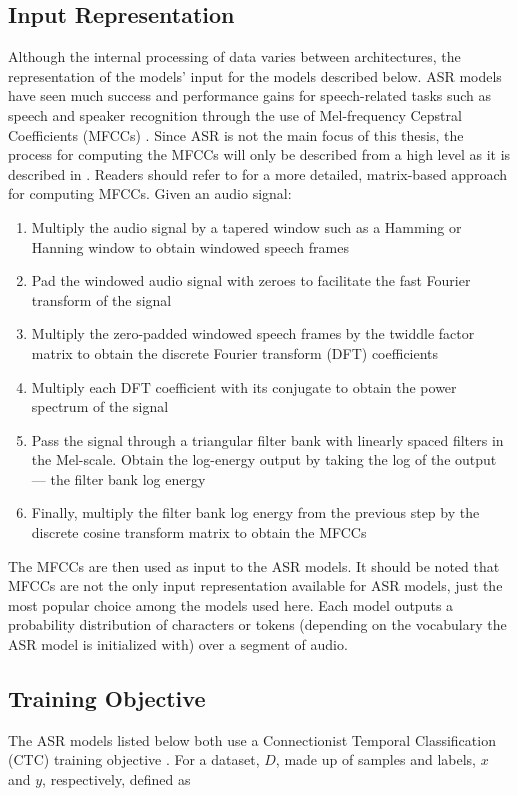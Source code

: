 \documentclass[12pt]{article}
\begin{document}
\subsection{Input Representation}\label{sec:asr_input_representation}
Although the internal processing of data varies between architectures, the representation of the models' input for the models described below.
ASR models have seen much success and performance gains for speech-related tasks such as speech and speaker recognition through the use of
Mel-frequency Cepstral Coefficients (MFCCs) \cite{sahidullah_design_2012}. Since ASR is not the main focus of this thesis, the process for computing
the MFCCs will only be described from a high level as it is described in \cite{sahidullah_design_2012}. Readers should refer to
\cite{sahidullah_design_2012} for a more detailed, matrix-based approach for computing MFCCs. Given an audio signal:

\begin{enumerate}
    \item Multiply the audio signal by a tapered window such as a Hamming or Hanning window to obtain windowed speech frames
    \item Pad the windowed audio signal with zeroes to facilitate the fast Fourier transform of the signal
    \item Multiply the zero-padded windowed speech frames by the twiddle factor matrix to obtain the discrete Fourier transform (DFT) coefficients
    \item Multiply each DFT coefficient with its conjugate to obtain the power spectrum of the signal
    \item Pass the signal through a triangular filter bank with linearly spaced filters in the Mel-scale. Obtain the log-energy output by taking the
          log of the output --- the filter bank log energy
    \item Finally, multiply the filter bank log energy from the previous step by the discrete cosine transform matrix to obtain the MFCCs
\end{enumerate}

\noindent
The MFCCs are then used as input to the ASR models. It should be noted that MFCCs are not the only input representation available
for ASR models, just the most popular choice among the models used here. Each model outputs a probability distribution of characters or tokens
(depending on the vocabulary the ASR model is initialized with) over a segment of audio.

\subsection{Training Objective}\label{sec:asr_training_objective}
The ASR models listed below both use a Connectionist Temporal Classification (CTC) training objective \cite{graves_connectionist_2006}. For a
dataset, $D$, made up of samples and labels, $x$ and $y$, respectively, defined as
\end{document}
